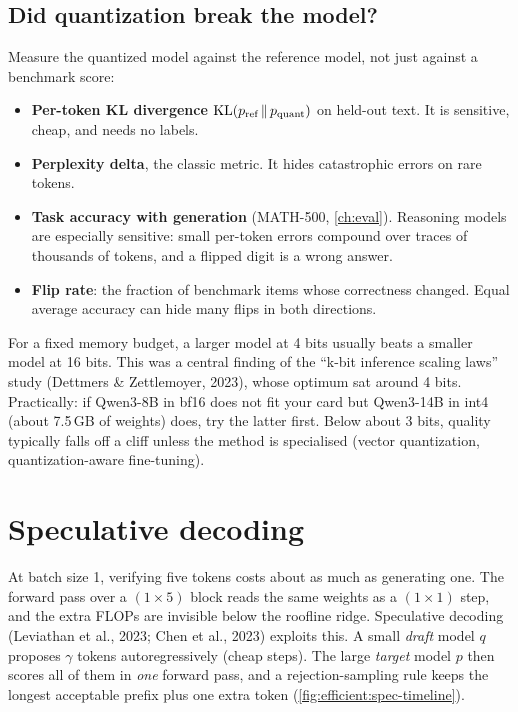 \subsection{Did quantization break the model?}
Measure the quantized model against the reference model, not just against a benchmark
score:
\begin{itemize}
  \item \textbf{Per-token KL divergence} $\operatorname{KL}(p_{\text{ref}}\,\|\,p_{\text{quant}})$ on held-out
        text. It is sensitive, cheap, and needs no labels.
  \item \textbf{Perplexity delta}, the classic metric. It hides catastrophic errors on
        rare tokens.
  \item \textbf{Task accuracy with generation} (MATH-500, \cref{ch:eval}). Reasoning
        models are especially sensitive: small per-token errors compound over traces of
        thousands of tokens, and a flipped digit is a wrong answer.
  \item \textbf{Flip rate}: the fraction of benchmark items whose correctness changed.
        Equal average accuracy can hide many flips in both directions.
\end{itemize}

\begin{deepdive}
For a fixed memory budget, a larger model at 4 bits usually beats a smaller model at 16
bits. This was a central finding of the ``k-bit inference scaling laws'' study (Dettmers
\& Zettlemoyer, 2023), whose optimum sat around 4 bits. Practically: if Qwen3-8B in bf16
does not fit your card but Qwen3-14B in int4 (about 7.5\,GB of weights) does, try the
latter first. Below about 3 bits, quality typically falls off a cliff unless the method
is specialised (vector quantization, quantization-aware fine-tuning).
\end{deepdive}

\section{Speculative decoding}\label{sec:efficient:spec}

At batch size 1, verifying five tokens costs about as much as generating one. The
forward pass over a $(1\times 5)$ block reads the same weights as a $(1\times1)$ step,
and the extra FLOPs are invisible below the roofline ridge. Speculative decoding (Leviathan
et al., 2023; Chen et al., 2023) exploits this. A small \emph{draft} model $q$
proposes $\gamma$ tokens autoregressively (cheap steps). The large \emph{target} model
$p$ then scores all of them in \emph{one} forward pass, and a rejection-sampling rule
keeps the longest acceptable prefix plus one extra token
(\cref{fig:efficient:spec-timeline}).

